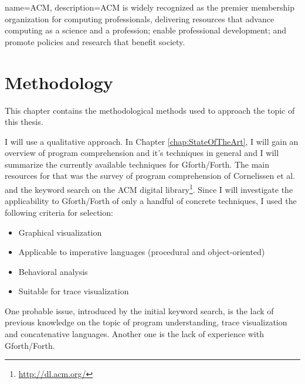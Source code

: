 {
  name={ACM},
  description={ACM is widely recognized as the premier membership organization for computing professionals, delivering resources that advance computing as a science and a profession; enable professional development; and promote policies and research that benefit society.}
}


\chapter{Methodology}
\label{chap:Methodology}

This chapter contains the methodological methods used to approach the topic of this thesis.

I will use a qualitative approach. In Chapter \ref{chap:StateOfTheArt}, I will gain an overview of program comprehension and it's techniques in general and I will summarize the currently available techniques for Gforth/Forth. The main resources for that was the survey of program comprehension of Cornelissen et al.\cite{Cornelissen:2009:SSP:1638616.1639301} and the keyword search on the \gls{ACM} digital library\footnote{\url{http://dl.acm.org/}}.
Since I will investigate the applicability to Gforth/Forth of only a handful of concrete techniques, I used the following criteria for selection:
\begin{itemize}
\item Graphical visualization 
\item Applicable to imperative languages (procedural and object-oriented)
\item Behavioral analysis
\item Suitable for trace visualization
\end{itemize}
One probable issue, introduced by the initial keyword search, is the lack of previous knowledge on the topic of program understanding, trace visualization and concatenative languages. Another one is the lack of experience with Gforth/Forth.

